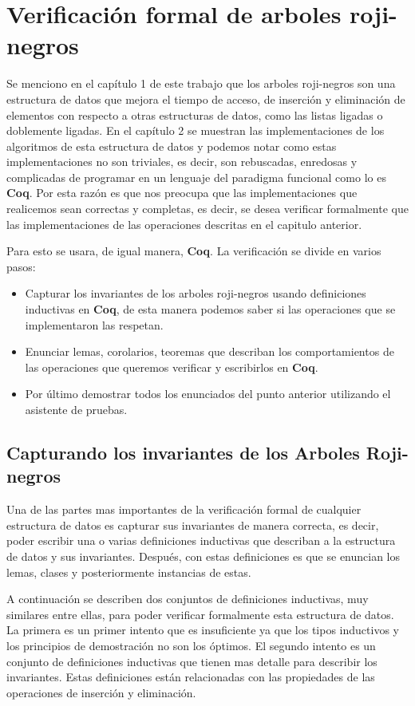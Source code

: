 \documentclass[letterpaper,12pt,oneside]{book}
\newcommand{\coq}{\textbf{Coq}}
\newcommand{\Arns}{Arboles Roji-negros}
\newcommand{\arns}{arboles roji-negros}
\theoremstyle{plain}
\theoremstyle{definition}
\theoremstyle{remark}
\begin{document}
\chapter{Verificación formal de {\arns}}
Se menciono en el cap\'itulo 1 de este trabajo que los {\arns} son una estructura de datos que mejora el 
tiempo de acceso, de inserción y eliminación de
elementos con respecto a otras estructuras de datos, como las listas ligadas o doblemente ligadas. En el 
cap\'itulo 2 se muestran las implementaciones de los algoritmos de esta  estructura de datos y podemos 
notar como estas implementaciones no son triviales, es decir, son rebuscadas, enredosas y complicadas de 
programar en un lenguaje del paradigma funcional como lo es {\coq}. 
Por esta razón es que nos preocupa que las implementaciones que realicemos sean correctas y completas, es
decir, se desea verificar formalmente que las implementaciones de las operaciones descritas en el 
capitulo anterior.

Para esto se usara, de igual manera, {\coq}. La verificaci\'on se divide en varios pasos:
\begin{itemize}
    \item Capturar los invariantes de los {\arns} usando definiciones inductivas en {\coq}, de esta 
    manera podemos saber si las operaciones que se implementaron las respetan.
    \item Enunciar lemas, corolarios, teoremas que describan los comportamientos de las operaciones que 
    queremos verificar y escribirlos en {\coq}.
    \item Por \'ultimo demostrar todos los enunciados del punto anterior utilizando el asistente de 
    pruebas.
\end{itemize}{}
\section{Capturando los invariantes de los {\Arns}}
Una de las partes mas importantes de la verificaci\'on formal de cualquier estructura de datos es 
capturar sus invariantes de manera correcta, es decir, poder escribir una o varias definiciones 
inductivas que describan a la estructura de datos y sus invariantes. Después, con estas 
definiciones es que se enuncian los lemas, clases y posteriormente instancias de estas. 

A continuaci\'on se describen dos conjuntos de definiciones inductivas, muy similares entre ellas, para 
poder verificar formalmente esta estructura de datos. La primera es un primer intento que es insuficiente
ya que los tipos inductivos y los principios de demostraci\'on no son los \'optimos. El segundo intento 
es un conjunto de definiciones inductivas que tienen mas detalle para describir los invariantes. Estas 
definiciones est\'an relacionadas con las propiedades de las operaciones de inserci\'on y eliminaci\'on. 
\end{document}
